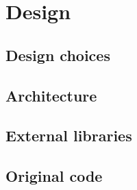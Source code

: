 \section{Design}

\subsection{Design choices}

\subsection{Architecture}

\subsection{External libraries}

\subsection{Original code}